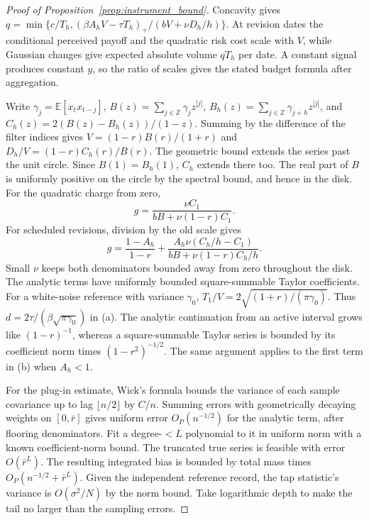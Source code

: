 \documentclass[12pt]{article}
\theoremstyle{definition}
\theoremstyle{remark}
\newcommand{\E}{\mathbb{E}}
\begin{document}
\begin{proof}[Proof of Proposition~\ref{prop:instrument_bound}]
Concavity gives $q=\min\{c/T_h,(\beta A_hV-\tau T_h)_+/(bV+\nu D_h/h)\}$. At revision dates the conditional perceived payoff and the quadratic risk cost scale with $V$, while Gaussian changes give expected absolute volume $qT_h$ per date. A constant signal produces constant $y$, so the ratio of scales gives the stated budget formula after aggregation.

Write $\gamma_j=\E[x_t x_{t-j}]$, $B(z)=\sum_{j\in\mathbb Z}\gamma_j z^{|j|}$,
$B_h(z)=\sum_{j\in\mathbb Z}\gamma_{j+h} z^{|j|}$, and $C_h(z)=2(B(z)-B_h(z))/(1-z)$. Summing by the difference of the filter indices gives $V=(1-r)B(r)/(1+r)$ and $D_h/V=(1-r)C_h(r)/B(r)$. The geometric bound extends the series past the unit circle. Since $B(1)=B_h(1)$, $C_h$ extends there too. The real part of $B$ is uniformly positive on the circle by the spectral bound, and hence in the disk. For the quadratic charge from zero,
\[
 g=\frac{\nu C_1}{bB+\nu(1-r)C_1}.
\]
For scheduled revisions, division by the old scale gives
\[
 g=\frac{1-A_h}{1-r}+
 \frac{A_h\nu(C_h/h-C_1)}{bB+\nu(1-r)C_h/h}.
\]
Small $\nu$ keeps both denominators bounded away from zero throughout the disk. The analytic terms have uniformly bounded square-summable Taylor coefficients. For a white-noise reference with variance $\gamma_0$, $T_1/V=2\sqrt{(1+r)/(\pi\gamma_0)}$. Thus $d=2\tau/(\beta\sqrt{\pi\gamma_0})$ in (a). The analytic continuation from an active interval grows like $(1-r)^{-1}$, whereas a square-summable Taylor series is bounded by its coefficient norm times $(1-r^2)^{-1/2}$. The same argument applies to the first term in (b) when $A_h<1$.

For the plug-in estimate, Wick's formula bounds the variance of each sample covariance up to lag $\lfloor n/2\rfloor$ by $C/n$. Summing errors with geometrically decaying weights on $[0,\bar r]$ gives uniform error $O_P(n^{-1/2})$ for the analytic term, after flooring denominators. Fit a degree-$<L$ polynomial to it in uniform norm with a known coefficient-norm bound. The truncated true series is feasible with error $O(\bar r^L)$. The resulting integrated bias is bounded by total mass times $O_P(n^{-1/2}+\bar r^L)$. Given the independent reference record, the tap statistic's variance is $O(\sigma^2/N)$ by the norm bound. Take logarithmic depth to make the tail no larger than the sampling errors.



\end{proof}
\end{document}
